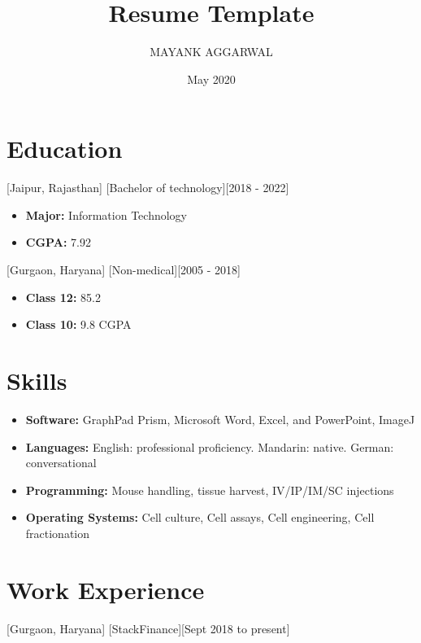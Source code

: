 \documentclass{article}
\title{Resume Template}
\author{MAYANK AGGARWAL}
\date{May 2020}
\begin{document}

\makecvtitle %

\section{Education}

[Jaipur, Rajasthan]
[Bachelor of technology][2018 - 2022]
\begin{itemize}
\item \textbf{Major:} Information Technology  
\item \textbf{CGPA:} 7.92
\end{itemize}

[Gurgaon, Haryana]
[Non-medical][2005 - 2018]
\begin{itemize}
\item \textbf{Class 12:} 85.2%
\item \textbf{Class 10:} 9.8 CGPA
\end{itemize}
 
\section{Skills}

\begin{itemize}
\item \textbf{Software:} GraphPad Prism, Microsoft Word, Excel, and PowerPoint, ImageJ
\item \textbf{Languages:} English: professional proficiency.  Mandarin: native.  German: conversational
\item \textbf{Programming:} Mouse handling, tissue harvest, IV/IP/IM/SC injections
\item \textbf{Operating Systems:} Cell culture, Cell assays, Cell engineering, Cell fractionation
\end{itemize}
 
\section{Work Experience}

[Gurgaon, Haryana]
[StackFinance][Sept 2018 to present]
\end{document}
